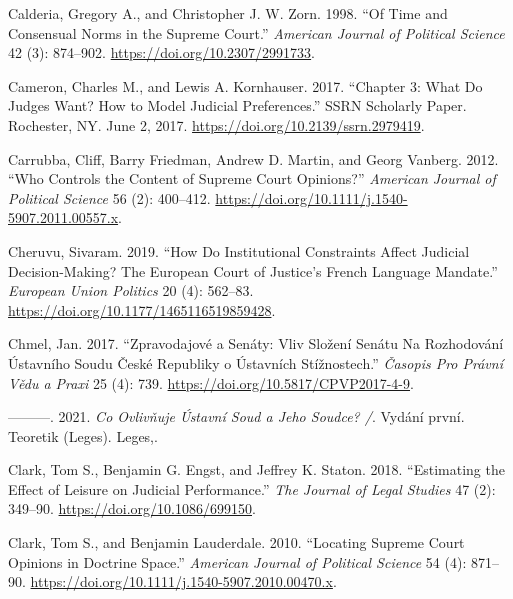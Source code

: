 \documentclass[
  11pt,
]{article}
\newlength{\cslhangindent}
\newenvironment{CSLReferences}[2] %
 {%
  \setlength{\parindent}{0pt}
  \ifodd #1 \everypar{\setlength{\hangindent}{\cslhangindent}}\ignorespaces\fi
  \ifnum #2 > 0
  \setlength{\parskip}{#2\baselineskip}
  \fi
 }%
 {}
\begin{document}
\begin{CSLReferences}{1}{0}
\leavevmode{}%
Calderia, Gregory A., and Christopher J. W. Zorn. 1998. {``Of {Time} and
{Consensual Norms} in the {Supreme Court}.''} \emph{American Journal of
Political Science} 42 (3): 874--902.
\url{https://doi.org/10.2307/2991733}.

\leavevmode{}%
Cameron, Charles M., and Lewis A. Kornhauser. 2017. {``Chapter 3: {What
Do Judges Want}? {How} to {Model Judicial Preferences}.''} SSRN
Scholarly Paper. Rochester, NY. June 2, 2017.
\url{https://doi.org/10.2139/ssrn.2979419}.

\leavevmode{}%
Carrubba, Cliff, Barry Friedman, Andrew D. Martin, and Georg Vanberg.
2012. {``Who {Controls} the {Content} of {Supreme Court Opinions}?''}
\emph{American Journal of Political Science} 56 (2): 400--412.
\url{https://doi.org/10.1111/j.1540-5907.2011.00557.x}.

\leavevmode{}%
Cheruvu, Sivaram. 2019. {``How Do Institutional Constraints Affect
Judicial Decision-Making? {The European Court} of {Justice}'s {French}
Language Mandate.''} \emph{European Union Politics} 20 (4): 562--83.
\url{https://doi.org/10.1177/1465116519859428}.

\leavevmode{}%
Chmel, Jan. 2017. {``Zpravodajové a Senáty: {Vliv} Složení Senátu Na
Rozhodování {Ústavního} Soudu {České} Republiky o Ústavních
Stížnostech.''} \emph{Časopis Pro Právní Vědu a Praxi} 25 (4): 739.
\url{https://doi.org/10.5817/CPVP2017-4-9}.

\leavevmode{}%
---------. 2021. \emph{Co Ovlivňuje {Ústavní} Soud a Jeho Soudce? /}.
Vydání první. Teoretik ({Leges}). Leges,.

\leavevmode{}%
Clark, Tom S., Benjamin G. Engst, and Jeffrey K. Staton. 2018.
{``Estimating the {Effect} of {Leisure} on {Judicial Performance}.''}
\emph{The Journal of Legal Studies} 47 (2): 349--90.
\url{https://doi.org/10.1086/699150}.

\leavevmode{}%
Clark, Tom S., and Benjamin Lauderdale. 2010. {``Locating {Supreme Court
Opinions} in {Doctrine Space}.''} \emph{American Journal of Political
Science} 54 (4): 871--90.
\url{https://doi.org/10.1111/j.1540-5907.2010.00470.x}.


\end{CSLReferences}
\end{document}
